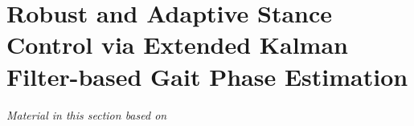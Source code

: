 \chapter{Robust and Adaptive Stance Control via Extended Kalman Filter-based
Gait Phase Estimation}\label{sec:phase_estimation}
\graphicspath{{chapters/phase_estimation/figures/}}

\emph{Material in this section based on}
\citet{thatte2019realtime}\cite{thatte2019realtime} 
\linebreak






